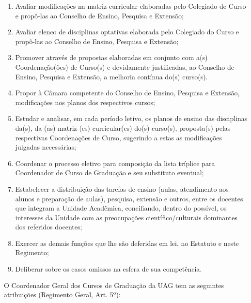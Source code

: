 \documentclass[
	12pt,				%
	openright,			%
  oneside,     %
	a4paper,			%
	chapter=TITLE,		%
	english,			%
	french,				%
	spanish,			%
	brazil				%
	]{abntex2}
\begin{document}
\begin{enumerate}
    \item Avaliar modificações na matriz curricular elaboradas pelo Colegiado de Curso e propô-las ao Conselho de Ensino, Pesquisa e Extensão;
    \item Avaliar elenco de disciplinas optativas elaborada pelo Colegiado do Curso e propô-las ao Conselho de Ensino, Pesquisa e Extensão;
    \item Promover através de propostas elaboradas em conjunto com a(s) 	Coordenação(ões) de Curso(s) e devidamente justificadas, ao Conselho de Ensino, Pesquisa e Extensão, a melhoria contínua do(s) curso(s).
    \item Propor 	à Câmara competente do Conselho de Ensino, Pesquisa e Extensão,  modificações nos planos dos respectivos cursos;
    \item Estudar e analisar, em cada período letivo, os planos de ensino das 	disciplinas da(s), da (as) matriz (es) curricular(es) do(s) curso(s), proposta(s) pelas respectivas Coordenações de Curso, sugerindo a estas as modificações julgadas necessárias;
    \item Coordenar o processo eletivo para composição da lista tríplice para Coordenador de Curso de Graduação e seu substituto eventual;
    \item Estabelecer a distribuição das tarefas de ensino (aulas, atendimento aos alunos e preparação de aulas), pesquisa, extensão e outros, entre os docentes que integram a Unidade Acadêmica, conciliando, dentro  do possível, os interesses da Unidade com as preocupações 	científico/culturais dominantes dos referidos docentes;
    \item Exercer as demais funções que lhe são deferidas em lei, no Estatuto e neste Regimento;
    \item Deliberar sobre os casos omissos na esfera de sua competência.
\end{enumerate}

O Coordenador Geral dos Cursos de Graduação da UAG tem as seguintes atribuições (Regimento Geral, Art. 5º):
\end{document}
